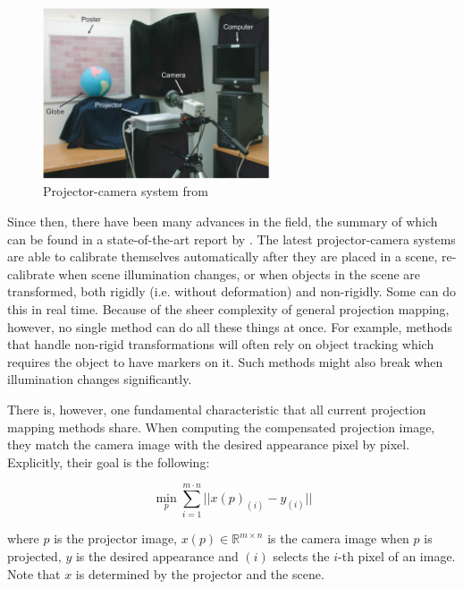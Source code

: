 \begin{figure}[ht]
    \centering
    \includegraphics[width=0.6\textwidth]{images/01-procam.png}
    \caption{Projector-camera system from \citet{Grossberg2004}}
    \label{fig:intro_procam}
\end{figure}

Since then, there have been many advances in the field, the summary of which can be found in a state-of-the-art report by \citet*{Grundhofer2018}. The latest projector-camera systems are able to calibrate themselves automatically after they are placed in a scene, re-calibrate when scene illumination changes, or when objects in the scene are transformed, both rigidly (i.e. without deformation) and non-rigidly. Some can do this in real time. Because of the sheer complexity of general projection mapping, however, no single method can do all these things at once. For example, methods that handle non-rigid transformations will often rely on object tracking which requires the object to have markers on it. Such methods might also break when illumination changes significantly.

There is, however, one fundamental characteristic that all current projection mapping methods share. When computing the compensated projection image, they match the camera image with the desired appearance pixel by pixel. Explicitly, their goal is the following:

\begin{equation}
    \label{eq:projection_mapping-per_pixel}
    \min_p \sum_{i=1}^{m \cdot n} || x(p)_{(i)} - y_{(i)} ||
\end{equation}

where \(p\) is the projector image, \(x(p) \in \mathbb{R}^{m \times n}\) is the camera image when \(p\) is projected, \(y\) is the desired appearance and \((i)\) selects the \(i\)-th pixel of an image. Note that \(x\) is determined by the projector and the scene.


